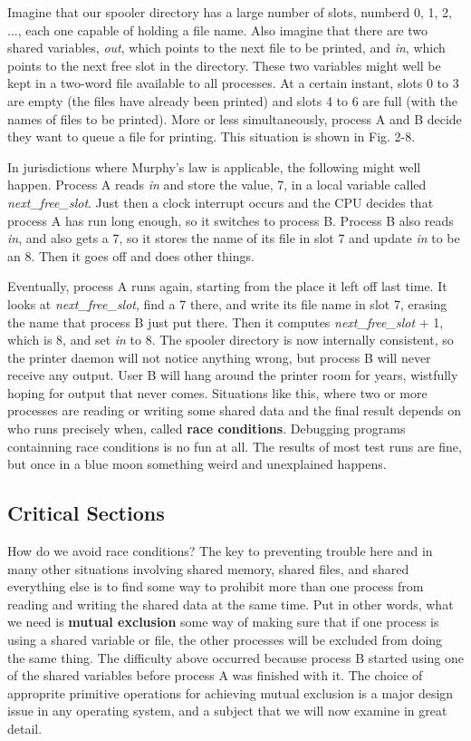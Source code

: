 \documentclass{book}
\newcommand {\kw}  [1] {\textbf{#1}}
\newcommand {\sys} [1] {\textsl{#1}}
\begin{document}
Imagine that our spooler directory has a large number of slots, numberd 0, 1, 2, ..., 
each one capable of holding a file name.
Also imagine that there are two shared variables, 
\sys{out}, which points to the next file to be printed,
and \sys{in}, which points to the next free slot in the directory.
These two variables might well be kept in a two-word file available to all processes.
At a certain instant, slots 0 to 3 are empty (the files have already been printed) and slots 4 to 6 are full (with the names of files to be printed).
More or less simultaneously, process A and B decide they want to queue a file for printing.
This situation is shown in Fig. 2-8.

In jurisdictions where Murphy's law is applicable, the following might well happen.
Process A reads \sys{in} and store the value, 7, in a local variable called \sys{next\_free\_slot}.
Just then a clock interrupt occurs and the CPU decides that process A has run long enough, 
so it switches to process B.
Process B also reads \sys{in}, and also gets a 7, so it stores the name of its file in slot 7 and update \sys{in} to be an 8.
Then it goes off and does other things.

Eventually, process A runs again, starting from the place it left off last time.
It looks at \sys{next\_free\_slot}, find a 7 there, and write its file name in slot 7, erasing the name that process B just put there.
Then it computes \sys{next\_free\_slot} + 1, which is 8, and set \sys{in} to 8.
The spooler directory is now internally consistent, so the printer daemon will not notice anything wrong,
but process B will never receive any output.
User B will hang around the printer room for years, wistfully hoping for output that never comes.
Situations like this, where two or more processes are reading or writing some shared data 
and the final result depends on who runs precisely when, called \kw{race conditions}.
Debugging programs containning race conditions is no fun at all.
The results of most test runs are fine, but once in a blue moon something weird and unexplained happens.

\subsection{Critical Sections}
How do we avoid race conditions?
The key to preventing trouble here and in many other situations involving shared memory, shared files, and shared everything else 
is to find some way to prohibit more than one process from reading and writing the shared data at the same time.
Put in other words, what we need is \kw{mutual exclusion} some way of making sure that
if one process is using a shared variable or file, the other processes will be excluded from doing the same thing.
The difficulty above occurred because process B started using one of the shared variables before process A was finished with it.
The choice of approprite primitive operations for achieving mutual exclusion is a major design issue in any operating system,
and a subject that we will now examine in great detail.
\end{document}
